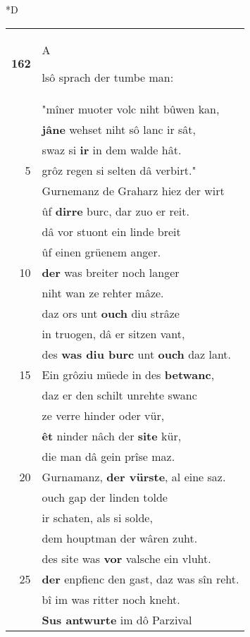 \documentclass[8pt,a4paper,notitlepage]{article}
\begin{document}
\begin{table}[ht]
\begin{minipage}[t]{0.5\linewidth}
\small
\begin{center}*D
\end{center}
\begin{tabular}{rl}
\textbf{162} & \begin{large}A\end{large}lsô sprach der tumbe man:\\ 
 & "mîner muoter volc niht bûwen kan,\\ 
 & \textbf{jâ}\textbf{ne} wehset niht sô lanc ir sât,\\ 
 & swaz si \textbf{ir} in dem walde hât.\\ 
5 & grôz regen si selten dâ verbirt."\\ 
 & Gurnemanz de Graharz hiez der wirt\\ 
 & ûf \textbf{dirre} burc, dar zuo er reit.\\ 
 & dâ vor stuont ein linde breit\\ 
 & ûf einen grüenem anger.\\ 
10 & \textbf{der} was breiter noch langer\\ 
 & niht wan ze rehter mâze.\\ 
 & daz ors unt \textbf{ouch} diu strâze\\ 
 & in truogen, dâ er sitzen vant,\\ 
 & des \textbf{was diu burc} unt \textbf{ouch} daz lant.\\ 
15 & Ein grôziu müede in des \textbf{betwanc},\\ 
 & daz er den schilt unrehte swanc\\ 
 & ze verre hinder oder vür,\\ 
 & \textbf{êt} ninder nâch der \textbf{site} kür,\\ 
 & die man dâ gein prîse maz.\\ 
20 & Gurnamanz, \textbf{der vürste}, al eine saz.\\ 
 & ouch gap der linden tolde\\ 
 & ir schaten, als si solde,\\ 
 & dem houptman der wâren zuht.\\ 
 & des site was \textbf{vor} valsche ein vluht.\\ 
25 & \textbf{der} enpfienc den gast, daz was sîn reht.\\ 
 & bî im was ritter noch kneht.\\ 
 & \textbf{Sus antwurte} im dô Parzival\\ 

\end{tabular}
\end{minipage}
\end{table}
\end{document}
